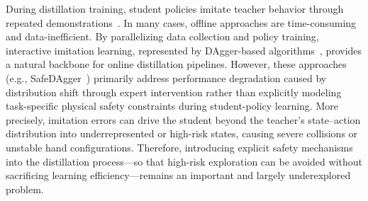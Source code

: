 During distillation training, student policies imitate teacher behavior through
repeated demonstrations~\cite{singh2024dextrah}. In many
cases, offline approaches are time-consuming and data-inefficient. By
parallelizing data collection and policy training, interactive imitation
learning, represented by DAgger-based algorithms~\cite{ross2011reduction},
provides a natural backbone for online distillation pipelines. However, these
approaches (e.g., SafeDAgger~\cite{zhang2016query}) primarily address
performance degradation caused by distribution shift through expert
intervention rather than explicitly modeling task-specific physical safety
constraints during student-policy learning. More precisely, imitation errors
can drive the student beyond the teacher's state--action distribution into
underrepresented or high-risk states, causing severe collisions or unstable
hand configurations.
Therefore, introducing explicit safety mechanisms into the distillation
process---so that high-risk exploration can be avoided without sacrificing
learning efficiency---remains an important and largely underexplored problem.



